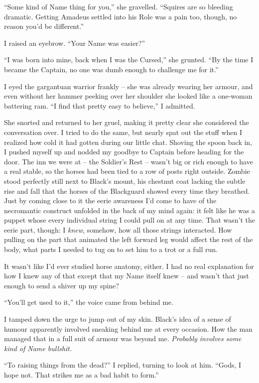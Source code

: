 \documentclass[12pt, openany]{book}
\begin{document}
“Some kind of Name thing for you,” she gravelled. “Squires are so bleeding dramatic. Getting Amadeus settled into his Role was a pain too, though, no reason you’d be different.”

I raised an eyebrow. “Your Name was easier?”

“I was born into mine, back when I was the Cursed,” she grunted. “By the time I became the Captain, no one was dumb enough to challenge me for it.”

I eyed the gargantuan warrior frankly – she was already wearing her armour, and even without her hammer peeking over her shoulder she looked like a one-woman battering ram. “I find that pretty easy to believe,” I admitted.

She snorted and returned to her gruel, making it pretty clear she considered the conversation over. I tried to do the same, but nearly spat out the stuff when I realized how cold it had gotten during our little chat. Shoving the spoon back in, I pushed myself up and nodded my goodbye to Captain before heading for the door. The inn we were at – the Soldier’s Rest – wasn’t big or rich enough to have a real stable, so the horses had been tied to a row of posts right outside. Zombie stood perfectly still next to Black’s mount, his chestnut coat lacking the subtle rise and fall that the horses of the Blackguard showed every time they breathed. Just by coming close to it the eerie awareness I’d come to have of the necromantic construct unfolded in the back of my mind again: it felt like he was a puppet whose every individual string I could pull on at any time. That wasn’t the eerie part, though: I \textit{knew}, somehow, how all those strings interacted. How pulling on the part that animated the left forward leg would affect the rest of the body, what parts I needed to tug on to set him to a trot or a full run.

It wasn’t like I’d ever studied horse anatomy, either. I had no real explanation for how I knew any of that except that my Name itself knew – and wasn’t that just enough to send a shiver up my spine?

“You’ll get used to it,” the voice came from behind me.

I tamped down the urge to jump out of my skin. Black’s idea of a sense of humour apparently involved sneaking behind me at every occasion. How the man managed that in a full suit of armour was beyond me. \textit{Probably involves some kind of Name bullshit.}

“To raising things from the dead?” I replied, turning to look at him. “Gods, I hope not. That strikes me as a bad habit to form.”
\end{document}
